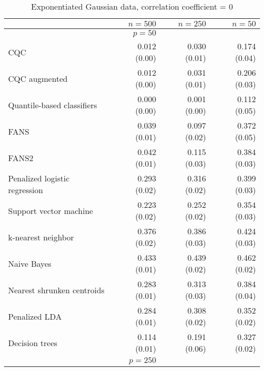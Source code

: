 \begin{table}[p]
  \centering
  \caption{Exponentiated Gaussian data, correlation coefficient = 0}
  \label{tab:exp-gauss-corr0}
  \vspace{5mm}
  
  \begin{adjustbox}{max size={\textwidth}{10cm}}
    \begin{tabular}{l@{\extracolsep{15mm}}rrr}
      
      \hline
      & $n=500$ & $n=250$ & $n=50$ \\ 
      \hline
      & $p = 50$ \\
      \hline

      CQC & 0.012 (0.00) & 0.030 (0.01) & 0.174 (0.04) \\ 
      CQC augmented & 0.012 (0.00) & 0.031 (0.01) & 0.206 (0.03) \\ 
      Quantile-based classifiers & 0.000 (0.00) & 0.001 (0.00) & 0.112 (0.05) \\ 
      FANS  & 0.039 (0.01) & 0.097 (0.02) & 0.372 (0.05) \\
      FANS2 & 0.042 (0.01) & 0.115 (0.03) & 0.384 (0.03) \\
      Penalized logistic regression & 0.293 (0.02) & 0.316 (0.02) & 0.399 (0.03) \\ 
      Support vector machine & 0.223 (0.02) & 0.252 (0.02) & 0.354 (0.03) \\ 
      k-nearest neighbor & 0.376 (0.02) & 0.386 (0.03) & 0.424 (0.03) \\ 
      Naive Bayes & 0.433 (0.01) & 0.439 (0.02) & 0.462 (0.02) \\ 
      Nearest shrunken centroids & 0.283 (0.01) & 0.313 (0.03) & 0.384 (0.04) \\ 
      Penalized LDA & 0.284 (0.01) & 0.308 (0.02) & 0.352 (0.02) \\ 
      Decision trees & 0.114 (0.01) & 0.191 (0.06) & 0.327 (0.02) \\ [2ex]

      \hline
      & $p = 250$ \\
      \hline


\end{tabular}
\end{adjustbox}
\end{table}
